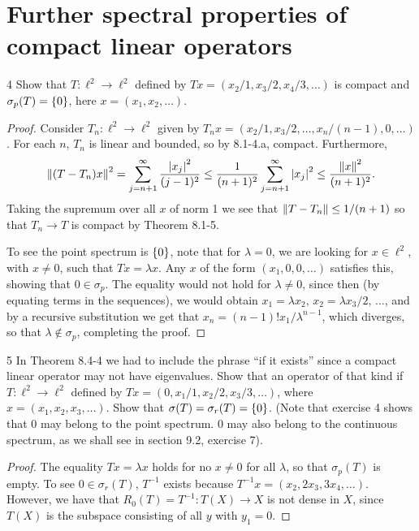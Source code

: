 \section{Further spectral properties of compact linear operators}


\begin{exercise}{4}
Show that $T: \ell^2 \to \ell^2$ defined by $T x = (x_2 / 1, x_3 / 2, x_4 / 3, \dots)$ is compact and $\sigma_p(T) = \{0\}$, here $x = (x_1, x_2, \dots)$.
\end{exercise}
\begin{proof}
Consider $T_n: \ell^2 \to \ell^2$ given by $T_n x = (x_2 / 1, x_3 / 2, \dots, x_n / (n-1), 0, \dots)$.
For each $n$, $T_n$ is linear and bounded, so by 8.1-4.a, compact.
Furthermore,
\begin{align*}
    \left\lVert (T - T_n) x\right\rVert^2
    = \sum_{j = n + 1}^\infty \frac{\left\lvert x_j\right\rvert^2}{(j - 1)^2}
    \leq \frac{1}{(n + 1)^2} \sum_{j = n + 1}^\infty \left\lvert x_j\right\rvert^2
    \leq \frac{\left\lVert x\right\rVert^2}{(n + 1)^2}.
\end{align*}
Taking the supremum over all $x$ of norm 1 we see that $\left\lVert T - T_n\right\rVert \leq 1 / (n + 1)$ so that $T_n \to T$ is compact by Theorem 8.1-5.

To see the point spectrum is $\{0\}$, note that for $\lambda = 0$, we are looking for $x \in \ell^2$, with $x \neq 0$, such that $T x = \lambda x$.
Any $x$ of the form $(x_1, 0, 0, \dots)$ satisfies this, showing that $0 \in \sigma_p$.
The equality would not hold for $\lambda \neq 0$, since then (by equating terms in the sequences), we would obtain $x_1 = \lambda x_2,\, x_2 = \lambda x_3 / 2,\, \dots$, and by a recursive substitution we get that $x_n = (n-1)! x_1 / \lambda^{n-1}$, which diverges, so that $\lambda \notin \sigma_p$, completing the proof.
\end{proof} 

\begin{exercise}{5}
In Theorem 8.4-4 we had to include the phrase ``if it exists'' since a compact linear operator may not have eigenvalues.
Show that an operator of that kind if $T: \ell^2 \to \ell^2$ defined by $T x = (0, x_1 / 1, x_2 / 2, x_3 / 3, \dots)$, where $x = (x_1, x_2, x_3, \dots)$.
Show that $\sigma(T) = \sigma_r(T) = \{0\}$.
(Note that exercise 4 shows that 0 may belong to the point spectrum.
0 may also belong to the continuous spectrum, as we shall see in section 9.2, exercise 7).
\end{exercise}
\begin{proof}
The equality $Tx = \lambda x$ holds for no $x \neq 0$ for all $\lambda$, so that $\sigma_p(T)$ is empty.
To see $0 \in \sigma_r(T)$, $T^{-1}$ exists because $T^{-1} x = (x_2, 2x_3, 3x_4, \dots)$.
However, we have that $R_0(T) = T^{-1}: T(X) \to X$ is not dense in $X$, since $T(X)$ is the subspace consisting of all $y$ with $y_1 = 0$.
\end{proof} 

